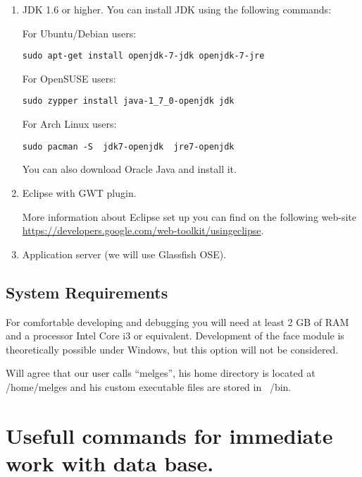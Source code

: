 \begin{enumerate}

\item JDK 1.6 or higher.
You can install JDK using the following commands:

For Ubuntu/Debian users:

\begin{lstlisting}
sudo apt-get install openjdk-7-jdk openjdk-7-jre
\end{lstlisting}

For OpenSUSE users:

\begin{lstlisting}
sudo zypper install java-1_7_0-openjdk jdk
\end{lstlisting}

For Arch Linux users:

\begin{lstlisting}
sudo pacman -S  jdk7-openjdk  jre7-openjdk
\end{lstlisting}

You can also download Oracle Java and install it.

\item Eclipse with GWT plugin.

More information about Eclipse set up you can find on the following web-site \url{https://developers.google.com/web-toolkit/usingeclipse}.

\item Application server (we will use Glassfish OSE).

\end{enumerate}

\subsection{System Requirements}

For comfortable developing and debugging you will need at least 2 GB of RAM and a processor Intel Core i3 or equivalent. Development of the face module is theoretically possible under Windows, but this option will not be considered.

Will agree that our user calls ``melges'', his home directory is located at /home/melges and his custom executable files are stored in ~/bin.

\section{Usefull commands for immediate work with data base.}

